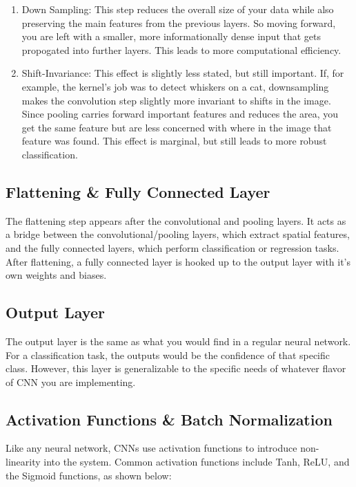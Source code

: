 \documentclass{article}
\begin{document}
        \begin{enumerate}
            \item Down Sampling: This step reduces the overall size of your data while also preserving the main features from the previous layers. So moving forward, you are left with a smaller, more informationally dense input that gets propogated into further layers. This leads to more computational efficiency.
            \item Shift-Invariance: This effect is slightly less stated, but still important. If, for example, the kernel's job was to detect whiskers on a cat, downsampling makes the convolution step slightly more invariant to shifts in the image. Since pooling carries forward important features and reduces the area, you get the same feature but are less concerned with where in the image that feature was found. This effect is marginal, but still leads to more robust classification.
        \end{enumerate}

    \subsection{Flattening \& Fully Connected Layer}
        The flattening step appears after the convolutional and pooling layers. It acts as a bridge between the convolutional/pooling layers, which extract spatial features, and the fully connected layers, which perform classification or regression tasks. After flattening, a fully connected layer is hooked up to the output layer with it's own weights and biases.
        
    \subsection{Output Layer}
        The output layer is the same as what you would find in a regular neural network. For a classification task, the outputs would be the confidence of that specific class. However, this layer is generalizable to the specific needs of whatever flavor of CNN you are implementing.

    \subsection{Activation Functions \& Batch Normalization}
        Like any neural network, CNNs use activation functions to introduce non-linearity into the system. Common activation functions include Tanh, ReLU, and the Sigmoid functions, as shown below:
\end{document}
